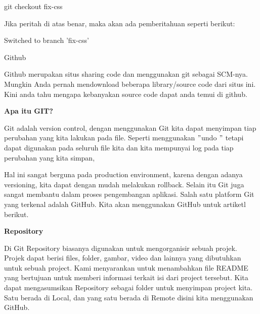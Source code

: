 \noindent 
 \hspace*{0.5in} git checkout fix-css \par
\noindent 
Jika peritah di atas benar, maka akan ada pemberitahuan seperti berikut: \par
\noindent 
 \hspace*{0.5in} Switched to branch 'fix-css' \par
\noindent 
 \hspace*{0.5in} \vspace{12pt}
\vspace{12pt}
\vspace{12pt}
\vspace{12pt}
\noindent 
Github \par
\noindent 
Github merupakan situs sharing code dan menggunakan git sebagai SCM-nya. Mungkin Anda pernah mendownload beberapa library/source code dari situs ini. Kini anda tahu mengapa kebanyakan source code dapat anda temui di github. \par
\vspace{12pt}
\noindent 
{\fontsize{14pt}{14pt}\selectfont \textbf{Apa itu GIT?} \\} \par
\noindent 
Git adalah version control, dengan menggunakan Git kita dapat menyimpan tiap perubahan yang kita lakukan pada file. Seperti menggunakan  $ " $undo $ " $ tetapi dapat digunakan pada seluruh file kita dan kita mempunyai log pada tiap perubahan yang kita simpan,  \par
\noindent 
Hal ini sangat berguna pada production environment, karena dengan adanya versioning, kita dapat dengan mudah melakukan rollback. Selain itu Git juga sangat membantu dalam proses pengembangan aplikasi. Salah satu platform Git yang terkenal adalah GitHub. Kita akan menggunakan GitHub untuk artiketl berikut. \par
\vspace{12pt}
\noindent 
{\fontsize{14pt}{14pt}\selectfont \textbf{Repository} \\} \par
\noindent 
Di Git Repository biasanya digunakan untuk mengorganisir sebuah projek. Projek dapat berisi files, folder, gambar, video dan lainnya yang dibutuhkan untuk sebuah project. Kami menyarankan untuk menambahkan file README yang bertujuan untuk memberi informasi terkait isi dari project tersebut. Kita dapat mengasumsikan Repository sebagai folder untuk menyimpan project kita. Satu berada di Local, dan yang satu berada di Remote disini kita menggunakan GitHub. \par
